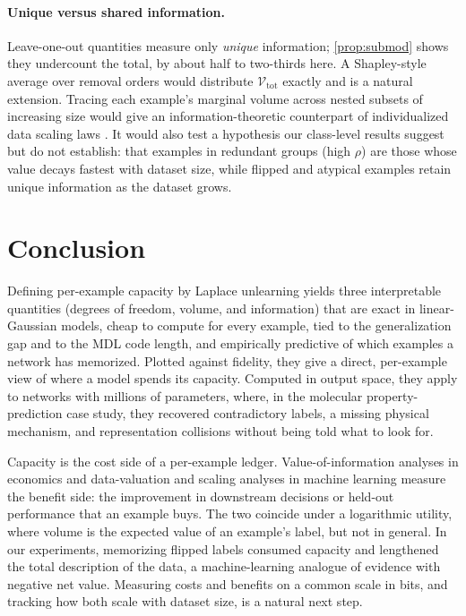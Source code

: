 \documentclass[10pt,twocolumn,letterpaper]{article}
\theoremstyle{definition}
\newcommand{\Vol}{\mathcal{V}}
\begin{document}
\paragraph{Unique versus shared information.} Leave-one-out quantities measure only \emph{unique} information; \cref{prop:submod} shows they undercount the total, by about half to two-thirds here. A Shapley-style average over removal orders would distribute $\Vol_{\mathrm{tot}}$ exactly and is a natural extension. Tracing each example's marginal volume across nested subsets of increasing size would give an information-theoretic counterpart of individualized data scaling laws \citep{covert2024}. It would also test a hypothesis our class-level results suggest but do not establish: that examples in redundant groups (high $\rho$) are those whose value decays fastest with dataset size, while flipped and atypical examples retain unique information as the dataset grows.

\section{Conclusion}
Defining per-example capacity by Laplace unlearning yields three interpretable quantities (degrees of freedom, volume, and information) that are exact in linear-Gaussian models, cheap to compute for every example, tied to the generalization gap and to the MDL code length, and empirically predictive of which examples a network has memorized. Plotted against fidelity, they give a direct, per-example view of where a model spends its capacity. Computed in output space, they apply to networks with millions of parameters, where, in the molecular property-prediction case study, they recovered contradictory labels, a missing physical mechanism, and representation collisions without being told what to look for.

Capacity is the cost side of a per-example ledger. Value-of-information analyses in economics \citep{abadie2023} and data-valuation and scaling analyses in machine learning \citep{ghorbani2019,covert2024} measure the benefit side: the improvement in downstream decisions or held-out performance that an example buys. The two coincide under a logarithmic utility, where volume is the expected value of an example's label, but not in general. In our experiments, memorizing flipped labels consumed capacity and lengthened the total description of the data, a machine-learning analogue of evidence with negative net value. Measuring costs and benefits on a common scale in bits, and tracking how both scale with dataset size, is a natural next step.
\end{document}
